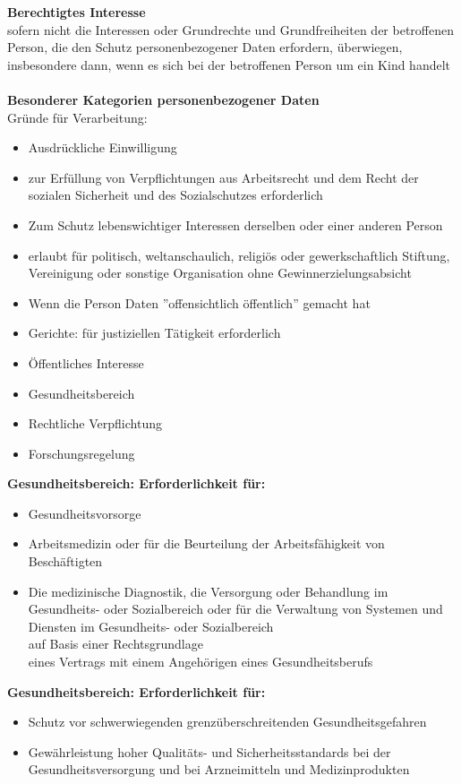 \documentclass[12pt,a4paper]{article}
\begin{document}
    \textbf{Berechtigtes Interesse}\\
    sofern nicht die Interessen oder
    Grundrechte und Grundfreiheiten der
    betroffenen Person, die den Schutz
    personenbezogener Daten erfordern,
    überwiegen, insbesondere dann, wenn es
    sich bei der betroffenen Person um ein Kind
    handelt
    \\ \\
    \textbf{Besonderer Kategorien personenbezogener Daten}\\
        Gründe für Verarbeitung: \\
        \begin{itemize}
            \item Ausdrückliche Einwilligung
            \item zur Erfüllung von Verpflichtungen aus Arbeitsrecht und dem Recht der sozialen Sicherheit und des Sozialschutzes erforderlich
            \item Zum Schutz lebenswichtiger Interessen derselben oder einer anderen Person
            \item erlaubt für politisch, weltanschaulich, religiös oder gewerkschaftlich Stiftung, Vereinigung oder sonstige Organisation ohne Gewinnerzielungsabsicht
            \item Wenn die Person Daten ''offensichtlich öffentlich'' gemacht hat
            \item Gerichte: für justiziellen Tätigkeit erforderlich 
            \item Öffentliches Interesse
            \item Gesundheitsbereich
            \item Rechtliche Verpflichtung
            \item Forschungsregelung
        \end{itemize}
    \textbf{Gesundheitsbereich: Erforderlichkeit für:}
        \begin{itemize}
            \item Gesundheitsvorsorge
            \item Arbeitsmedizin oder für die Beurteilung der Arbeitsfähigkeit von Beschäftigten
            \item Die medizinische Diagnostik, die Versorgung oder Behandlung im Gesundheits- oder Sozialbereich oder für die Verwaltung von Systemen und Diensten im Gesundheits- oder Sozialbereich \\
                auf Basis einer Rechtsgrundlage \\
                eines Vertrags mit einem Angehörigen eines Gesundheitsberufs
        \end{itemize}
    \textbf{Gesundheitsbereich: Erforderlichkeit für:}
        \begin{itemize}
            \item Schutz vor schwerwiegenden grenzüberschreitenden Gesundheitsgefahren
            \item Gewährleistung hoher Qualitäts- und Sicherheitsstandards bei der Gesundheitsversorgung und bei Arzneimitteln und Medizinprodukten
        \end{itemize}
        
\end{document}
